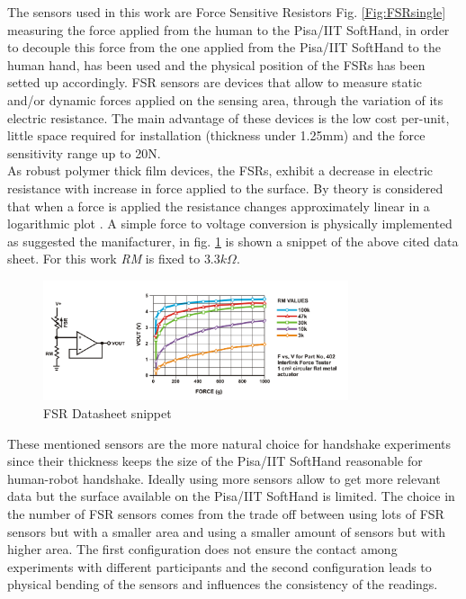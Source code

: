 The sensors used in this work are Force Sensitive Resistors Fig. \ref{Fig:FSRsingle} measuring the force applied from the human to the Pisa/IIT SoftHand, in order to decouple this force from the one applied from the Pisa/IIT SoftHand to the human hand, \cite{espen} has been used and the physical position of the FSRs has been setted up accordingly.
FSR sensors are devices that allow to measure static and/or dynamic forces applied on the sensing area, through the variation of its electric resistance. The main advantage of these devices is the low cost per-unit, little space required for installation (thickness under 1.25mm) and the force sensitivity range up to 20N.\\
As robust polymer thick film devices, the FSRs, exhibit a decrease in electric resistance with increase in force applied to the surface. By theory is considered that when a force is applied the resistance changes approximately linear in a logarithmic plot \cite{fsrdatasheet}.
A simple force to voltage conversion is physically implemented as suggested the manifacturer, in fig. \ref{Fig:FSRcircuit} is shown a snippet of the above cited data sheet. For this work \textit{RM} is fixed to $3.3 k \Omega $. \\
\begin{figure}[ht]
\centering
\includegraphics[width=0.8\textwidth]{Figure/fsr.png}
\caption{FSR Datasheet snippet}
\label{Fig:FSRcircuit}
\end{figure}
These mentioned sensors are the more natural choice for handshake experiments since their thickness keeps the size of the Pisa/IIT SoftHand reasonable for human-robot handshake.
% 
Ideally using more sensors allow to get more relevant data but the surface available on the Pisa/IIT SoftHand is limited. The choice in the number of FSR sensors comes from the trade off between using lots of FSR sensors but with a smaller area and using a smaller amount of sensors but with higher area. The first configuration does not ensure the contact among experiments with different participants and the second configuration leads to physical bending of the sensors and influences the consistency of the readings.

